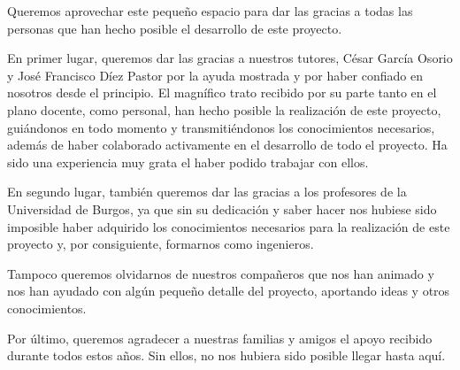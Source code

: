 Queremos aprovechar este pequeño espacio para dar las gracias a todas las personas que han
hecho posible el desarrollo de este proyecto.

En primer lugar, queremos dar las gracias a nuestros tutores, César García Osorio y José Francisco Díez
Pastor por la ayuda mostrada y por haber confiado en nosotros desde el principio. El magnífico trato recibido por su parte tanto en el plano docente, como personal, han hecho posible la realización de este proyecto, guiándonos en todo momento y transmitiéndonos los conocimientos necesarios, además de haber colaborado activamente en el desarrollo de todo el proyecto. Ha sido una experiencia muy grata el haber podido trabajar con ellos.

En segundo lugar, también queremos dar las gracias a los profesores de la Universidad de Burgos, ya que sin su dedicación y saber hacer nos hubiese sido imposible haber adquirido los conocimientos necesarios para la realización de este proyecto y, por consiguiente, formarnos como ingenieros.

Tampoco queremos olvidarnos de nuestros compañeros que nos han animado y nos han ayudado con algún pequeño detalle del proyecto, aportando ideas y otros conocimientos.

Por último, queremos agradecer a nuestras familias y amigos el apoyo recibido durante todos estos años. Sin ellos, no nos hubiera sido posible llegar hasta aquí.